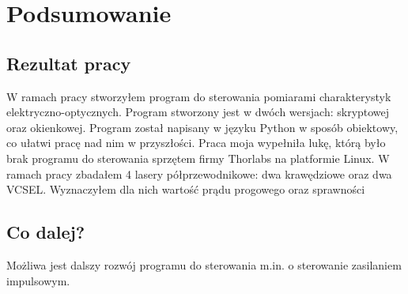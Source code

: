\chapter{Podsumowanie}
\section{Rezultat pracy}
W ramach pracy stworzyłem program do sterowania pomiarami charakterystyk elektryczno-optycznych. Program stworzony jest
w dwóch wersjach: skryptowej oraz okienkowej. Program został napisany w języku Python w sposób obiektowy, co ułatwi
pracę nad nim w przyszłości. Praca moja wypełniła lukę, którą było brak programu do sterowania sprzętem firmy Thorlabs
na platformie Linux. W ramach pracy zbadałem 4 lasery półprzewodnikowe: dwa krawędziowe oraz dwa VCSEL. Wyznaczyłem dla nich
wartość prądu progowego oraz sprawności
\section{Co dalej?}
Możliwa jest dalszy rozwój programu do sterowania m.in. o sterowanie zasilaniem impulsowym.

